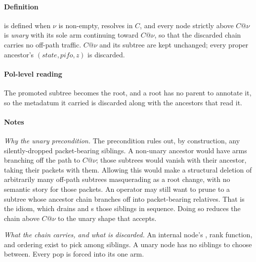 \paragraph{Definition}

\ChangeRoot{} is defined when \(\nu\) is non-empty, resolves in \(C\), and every node strictly above \(C@\nu\) is \emph{unary} with its sole arm continuing toward \(C@\nu\), so that the discarded chain carries no off-path traffic.
\(C@\nu\) and its subtree are kept unchanged; every proper ancestor's \((\mathit{state}, \mathit{pifo}, \mathit{z})\) is discarded.

\paragraph{Pol-level reading}

The promoted subtree becomes the root, and a root has no parent to annotate it, so the metadatum it carried is discarded along with the ancestors that read it.

\paragraph{Notes}

\emph{Why the unary precondition.}
The precondition rules out, by construction, any silently-dropped packet-bearing siblings.
A non-unary ancestor would have arms branching off the path to \(C@\nu\); those subtrees would vanish with their ancestor, taking their packets with them.
Allowing this would make \ChangeRoot{} a structural deletion of arbitrarily many off-path subtrees masquerading as a root change, with no semantic story for those packets.
An operator may still want to prune to a subtree whose ancestor chain branches off into packet-bearing relatives.
That is the \PruneDownTo{} idiom, which drains and \Remove{}s those siblings in sequence.
Doing so reduces the chain above \(C@\nu\) to the unary shape that \ChangeRoot{} accepts.

\emph{What the chain carries, and what is discarded.}
An internal node's \nodestate, rank function, and \pifo ordering exist to pick among siblings.
A unary node has no siblings to choose between.
Every pop is forced into its one arm.

